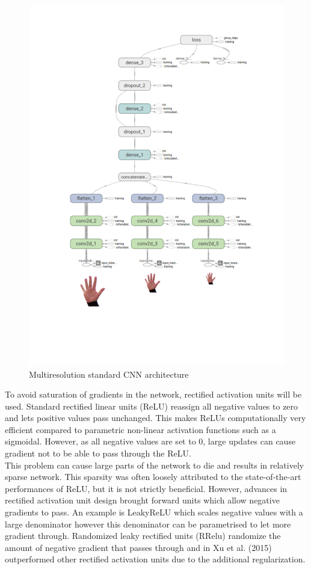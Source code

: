 \documentclass{article}
\begin{document}
\begin{figure}[h]
  \centering
  \includegraphics[scale=0.4]{tbgraph.pdf}
  \vspace*{-15mm}
  \caption{Multiresolution standard CNN architecture}
  \label{fig:multiinput}
\end{figure}

To avoid saturation of gradients in the network, rectified activation units will be used. Standard rectified linear units (ReLU) reassign all negative values to zero and lets positive values pass unchanged. This makes ReLUs computationally very efficient compared to parametric non-linear activation functions such as a sigmoidal. However, as all negative values are set to 0, large updates can cause gradient not to be able to pass through the ReLU.\\

This problem can cause large parts of the network to die and results in relatively sparse network. This sparsity was often loosely attributed to the state-of-the-art performances of ReLU, but it is not strictly beneficial. However, advances in rectified activation unit design brought forward units which allow negative gradients to pass. An example is LeakyReLU which scales negative values with a large denominator however this denominator can be parametrised to let more gradient through. Randomized leaky rectified units (RRelu) randomize the amount of negative gradient that passes through and in Xu et al. (2015) outperformed other rectified activation units due to the additional regularization.\\
\end{document}
